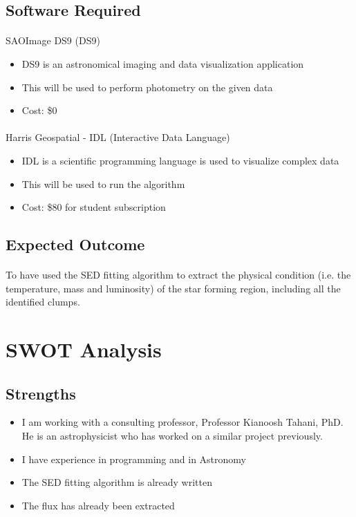 \documentclass{article}
\begin{document}
\subsection{Software Required}
\paragraph{}
SAOImage DS9 (DS9)

\begin{itemize}
\item DS9 is an astronomical imaging and data visualization application
\item This will be used to perform photometry on the given data
\item Cost: \$0
\end{itemize}

\paragraph{}
Harris Geospatial - IDL (Interactive Data Language)

\begin{itemize}
\item IDL is a scientific programming language is used to visualize complex data
\item This will be used to run the algorithm
\item Cost: \$80 for student subscription
\end{itemize}

\subsection{Expected Outcome}
\paragraph{}
To have used the SED fitting algorithm to extract the physical condition (i.e. the temperature, mass and luminosity) of the star forming region, including all the identified clumps.  

\section{SWOT Analysis}

\subsection{Strengths}

\begin{itemize}
\item I am working with a consulting professor, Professor Kianoosh Tahani, PhD. He is an astrophysicist who has worked on a similar project previously.
\item I have experience in programming and in Astronomy
\item The SED fitting algorithm is already written 
\item The flux has already been extracted
\end{itemize}
\end{document}
